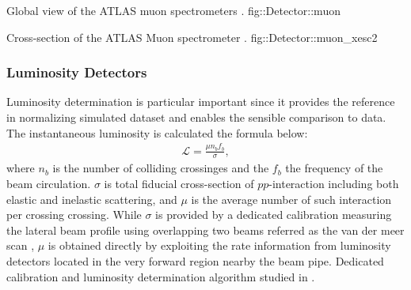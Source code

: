 {Global view of the ATLAS muon spectrometers \cite{ATLAS_exp}.}
{fig::Detector::muon}


{Cross-section of the ATLAS Muon spectrometer \cite{ATLAScosmicPerf}.}
{fig::Detector::muon_xesc2}



\subsubsection{Luminosity Detectors}
Luminosity determination is particular important since it provides the reference in normalizing simulated dataset and enables the sensible comparison to data. 
The instantaneous luminosity is calculated the formula below:
\begin{align}
\mathcal{L} = \frac{\mu n_b f_b}{\sigma},
\end{align}
where $n_b$ is the number of colliding crossinges and the $f_b$ the frequency of the beam circulation.
$\sigma$ is total fiducial cross-section of $pp$-interaction including both elastic and inelastic scattering, and $\mu$ is the average number of such interaction per crossing crossing. While $\sigma$ is provided by a dedicated calibration measuring the lateral beam profile using overlapping two beams referred as the van der meer scan \cite{VdMScan}, $\mu$ is obtained directly by exploiting the rate information from luminosity detectors located in the very forward region nearby the beam pipe. Dedicated calibration and luminosity determination algorithm studied in \cite{LumiMeasurement}.

